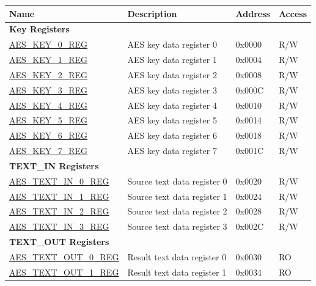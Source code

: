 \begin{longtable}{ | p{6cm} | p{7.2cm} | p{1.3cm} | p{1cm} | }
\hline\rowcolor{lightgray}
\textbf{Name} & \textbf{Description} &  \textbf{Address} & \textbf{Access} \\ \hline
\endhead
\multicolumn{4}{|l|}{\textbf{Key Registers}} \\ \hline
\hyperref[regdesc:AESKEYNREG]{AES\_KEY\_0\_REG} & AES key data register 0				& 0x0000 & R/W \\ \hline
\hyperref[regdesc:AESKEYNREG]{AES\_KEY\_1\_REG} & AES key data register 1				& 0x0004 & R/W \\ \hline
\hyperref[regdesc:AESKEYNREG]{AES\_KEY\_2\_REG} & AES key data register 2				& 0x0008 & R/W \\ \hline
\hyperref[regdesc:AESKEYNREG]{AES\_KEY\_3\_REG} & AES key data register 3				& 0x000C & R/W \\ \hline
\hyperref[regdesc:AESKEYNREG]{AES\_KEY\_4\_REG} & AES key data register 4				& 0x0010 & R/W \\ \hline
\hyperref[regdesc:AESKEYNREG]{AES\_KEY\_5\_REG} & AES key data register 5				& 0x0014 & R/W \\ \hline
\hyperref[regdesc:AESKEYNREG]{AES\_KEY\_6\_REG} & AES key data register 6				& 0x0018 & R/W \\ \hline
\hyperref[regdesc:AESKEYNREG]{AES\_KEY\_7\_REG} & AES key data register 7				& 0x001C & R/W \\ \hline
\multicolumn{4}{|l|}{\textbf{TEXT\_IN Registers}} \\ \hline
\hyperref[regdesc:AESTEXTINNREG]{AES\_TEXT\_IN\_0\_REG} & Source text data register 0					& 0x0020 & R/W \\ \hline
\hyperref[regdesc:AESTEXTINNREG]{AES\_TEXT\_IN\_1\_REG} & Source text data register 1					& 0x0024 & R/W \\ \hline
\hyperref[regdesc:AESTEXTINNREG]{AES\_TEXT\_IN\_2\_REG} & Source text data register 2					& 0x0028 & R/W \\ \hline
\hyperref[regdesc:AESTEXTINNREG]{AES\_TEXT\_IN\_3\_REG} & Source text data register 3					& 0x002C & R/W \\ \hline
\multicolumn{4}{|l|}{\textbf{TEXT\_OUT Registers}} \\ \hline
\hyperref[regdesc:AESTEXTOUTNREG]{AES\_TEXT\_OUT\_0\_REG} & Result text data register 0					& 0x0030 & RO \\ \hline
\hyperref[regdesc:AESTEXTOUTNREG]{AES\_TEXT\_OUT\_1\_REG} & Result text data register 1					& 0x0034 & RO \\ \hline

\end{longtable}
